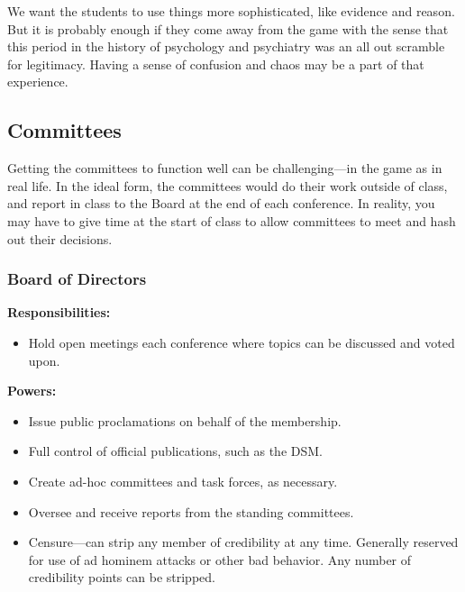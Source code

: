 \begin{refsection}
We want the students to use things more sophisticated, like evidence and reason. But it is probably enough if they come away from the game with the sense that this period in the history of psychology and psychiatry was an all out scramble for legitimacy. Having a sense of confusion and chaos may be a part of that experience.

\subsection{Committees}
\label{committees}

Getting the committees to function well can be challenging---in the game as in real life. In the ideal form, the committees would do their work outside of class, and report in class to the Board at the end of each conference. In reality, you may have to give time at the start of class to allow committees to meet and hash out their decisions.

\subsubsection{Board of Directors}
\label{boardofdirectors}

\textbf{Responsibilities:}

\begin{itemize}
\item Hold open meetings each conference where topics can be discussed and voted upon.

\end{itemize}

\textbf{Powers:}

\begin{itemize}
\item Issue public proclamations on behalf of the membership.

\item Full control of official publications, such as the DSM.

\item Create ad-hoc committees and task forces, as necessary.

\item Oversee and receive reports from the standing committees.

\item Censure---can strip any member of credibility at any time. Generally reserved for use of ad hominem attacks or other bad behavior. Any number of credibility points can be stripped.


\end{itemize}
\end{refsection}
